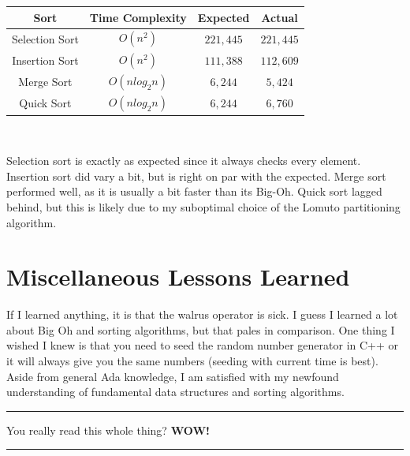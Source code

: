 \documentclass[letterpaper, 10pt]{article}
\begin{document}
\begin{center}
\begin{tabular}{||c c c c||} 
 \hline
 Sort & Time Complexity & Expected & Actual\\ [0.5ex] 
 \hline\hline
 Selection Sort & \( O(n^2)\) & \(221,445\) & \(221,445\) \\
 \hline
 Insertion Sort & \( O(n^2)\) & \(111,388\) & \(112,609\) \\
 \hline
 Merge Sort & \( O(nlog_2n)\) & \(6,244\) & \(5,424\) \\
 \hline
 Quick Sort & \( O(nlog_2n)\) & \(6,244\) & \(6,760\) \\
 \hline
\end{tabular}
\\

\end{center}
Selection sort is exactly as expected since it always checks every element. Insertion sort did vary a bit, but is right on par with the expected. Merge sort performed well, as it is usually a bit faster than its Big-Oh. Quick sort lagged behind, but this is likely due to my suboptimal choice of the Lomuto partitioning algorithm.
\newpage
\section{Miscellaneous Lessons Learned}
If I learned anything, it is that the walrus operator is sick. I guess I learned a lot about Big Oh and sorting algorithms, but that pales in comparison. One thing I wished I knew is that you need to seed the random number generator in C++ or it will always give you the same numbers (seeding with current time is best). Aside from general Ada knowledge, I am satisfied with my newfound understanding of fundamental data structures and sorting algorithms. 
\newline
\hrule
\vspace{.25cm}
You really read this whole thing? \textbf{WOW!}
\vspace{.25cm}
\hrule
\end{document}

